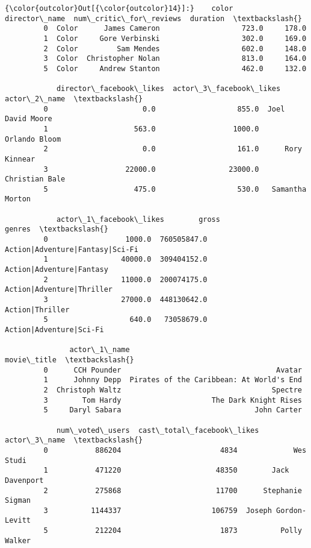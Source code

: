\documentclass[11pt]{article}
\begin{document}
\begin{Verbatim}[commandchars=\\\{\}]
{\color{outcolor}Out[{\color{outcolor}14}]:}    color      director\_name  num\_critic\_for\_reviews  duration  \textbackslash{}
         0  Color      James Cameron                   723.0     178.0   
         1  Color     Gore Verbinski                   302.0     169.0   
         2  Color         Sam Mendes                   602.0     148.0   
         3  Color  Christopher Nolan                   813.0     164.0   
         5  Color     Andrew Stanton                   462.0     132.0   
         
            director\_facebook\_likes  actor\_3\_facebook\_likes      actor\_2\_name  \textbackslash{}
         0                      0.0                   855.0  Joel David Moore   
         1                    563.0                  1000.0     Orlando Bloom   
         2                      0.0                   161.0      Rory Kinnear   
         3                  22000.0                 23000.0    Christian Bale   
         5                    475.0                   530.0   Samantha Morton   
         
            actor\_1\_facebook\_likes        gross                           genres  \textbackslash{}
         0                  1000.0  760505847.0  Action|Adventure|Fantasy|Sci-Fi   
         1                 40000.0  309404152.0         Action|Adventure|Fantasy   
         2                 11000.0  200074175.0        Action|Adventure|Thriller   
         3                 27000.0  448130642.0                  Action|Thriller   
         5                   640.0   73058679.0          Action|Adventure|Sci-Fi   
         
               actor\_1\_name                                movie\_title  \textbackslash{}
         0      CCH Pounder                                    Avatar    
         1      Johnny Depp  Pirates of the Caribbean: At World's End    
         2  Christoph Waltz                                   Spectre    
         3        Tom Hardy                     The Dark Knight Rises    
         5     Daryl Sabara                               John Carter    
         
            num\_voted\_users  cast\_total\_facebook\_likes          actor\_3\_name  \textbackslash{}
         0           886204                       4834             Wes Studi   
         1           471220                      48350        Jack Davenport   
         2           275868                      11700      Stephanie Sigman   
         3          1144337                     106759  Joseph Gordon-Levitt   
         5           212204                       1873          Polly Walker   
         

\end{Verbatim}
\end{document}
